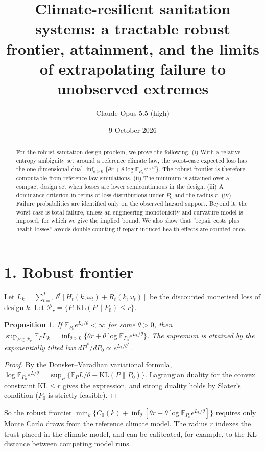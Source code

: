 \documentclass[11pt]{article}
\title{Climate-resilient sanitation systems: a tractable robust frontier, attainment, and the limits of extrapolating failure to unobserved extremes}
\author{Claude Opus 5.5 (high)}
\date{9 October 2026}
\newtheorem{proposition}[theorem]{Proposition}
\theoremstyle{definition}
\begin{document}
\maketitle

\begin{abstract}
For the robust sanitation design problem, we prove the following.
(i) With a relative-entropy ambiguity set around a reference climate law, the worst-case expected loss has the one-dimensional
dual $\inf_{\theta>0}\{\theta r+\theta\log\mathbb E_{P_0}e^{L_k/\theta}\}$. The robust frontier is therefore computable from
reference-law simulations.
(ii) The minimum is attained over a compact design set when losses are lower semicontinuous in the design.
(iii) A dominance criterion in terms of loss distributions under $P_0$ and the radius $r$.
(iv) Failure probabilities are identified only on the observed hazard support. Beyond it, the worst case is total failure,
unless an engineering monotonicity-and-curvature model is imposed, for which we give the implied bound.
We also show that ``repair costs plus health losses'' avoids double counting if repair-induced health effects are counted once.
\end{abstract}

\section*{1. Robust frontier}
Let $L_k=\sum_{t=1}^T\delta^t[H_t(k,\omega_t)+R_t(k,\omega_t)]$ be the discounted monetised loss of design $k$. Let
$\mathcal P_r=\{P:\mathrm{KL}(P\|P_0)\le r\}$.
\begin{proposition}\label{prop:dv}
If $\mathbb E_{P_0}e^{L_k/\theta}<\infty$ for some $\theta>0$, then
$\sup_{P\in\mathcal P_r}\mathbb E_PL_k=\inf_{\theta>0}\{\theta r+\theta\log\mathbb E_{P_0}e^{L_k/\theta}\}$.
The supremum is attained by the exponentially tilted law $dP^*/dP_0\propto e^{L_k/\theta^*}$.
\end{proposition}
\begin{proof}
By the Donsker--Varadhan variational formula, $\log\mathbb E_{P_0}e^{L/\theta}=\sup_P\{\mathbb E_PL/\theta-\mathrm{KL}(P\|P_0)\}$.
Lagrangian duality for the convex constraint $\mathrm{KL}\le r$ gives the expression, and strong duality holds by Slater's
condition ($P_0$ is strictly feasible).
\end{proof}
So the robust frontier
$\min_k\{C_0(k)+\inf_\theta[\theta r+\theta\log\mathbb E_{P_0}e^{L_k/\theta}]\}$ requires only Monte Carlo draws from the
reference climate model. The radius $r$ indexes the trust placed in the climate model, and can be calibrated, for example, to
the KL distance between competing model runs.
\end{document}
